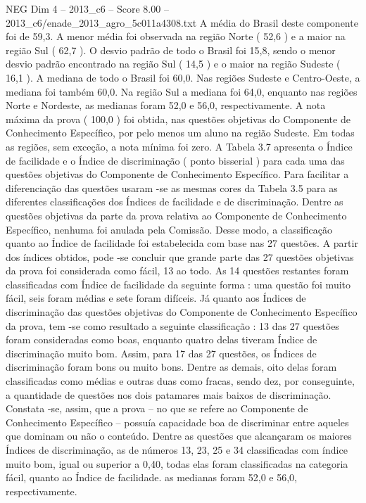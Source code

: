 \begin{textsample}{NEG Dim 4 – 2013\_c6 – Score 8.00 – 2013\_c6/enade\_2013\_agro\_5c011a4308.txt}
A média do Brasil deste componente foi de 59,3.
A menor média foi observada na região Norte ( 52,6 ) e a maior na região Sul ( 62,7 ).
O desvio padrão de todo o Brasil foi 15,8, sendo o menor desvio padrão encontrado na região Sul ( 14,5 ) e o maior na região Sudeste ( 16,1 ).
A mediana de todo o Brasil foi 60,0.
Nas regiões Sudeste e Centro-Oeste, a mediana foi também 60,0.
Na região Sul a mediana foi 64,0, enquanto nas regiões Norte e Nordeste, as medianas foram 52,0 e 56,0, respectivamente.
A nota máxima da prova ( 100,0 ) foi obtida, nas questões objetivas do Componente de Conhecimento Específico, por pelo menos um aluno na região Sudeste.
Em todas as regiões, sem exceção, a nota mínima foi zero.
A Tabela 3.7 apresenta o Índice de facilidade e o Índice de discriminação ( ponto bisserial ) para cada uma das questões objetivas do Componente de Conhecimento Específico.
Para facilitar a diferenciação das questões usaram -se as mesmas cores da Tabela 3.5 para as diferentes classificações dos Índices de facilidade e de discriminação.
Dentre as questões objetivas da parte da prova relativa ao Componente de Conhecimento Específico, nenhuma foi anulada pela Comissão.
Desse modo, a classificação quanto ao Índice de facilidade foi estabelecida com base nas 27 questões.
A partir dos índices obtidos, pode -se concluir que grande parte das 27 questões objetivas da prova foi considerada como fácil, 13 ao todo.
As 14 questões restantes foram classificadas com Índice de facilidade da seguinte forma : uma questão foi muito fácil, seis foram médias e sete foram difíceis.
Já quanto aos Índices de discriminação das questões objetivas do Componente de Conhecimento Específico da prova, tem -se como resultado a seguinte classificação : 13 das 27 questões foram consideradas como boas, enquanto quatro delas tiveram Índice de discriminação muito bom.
Assim, para 17 das 27 questões, os Índices de discriminação foram bons ou muito bons.
Dentre as demais, oito delas foram classificadas como médias e outras duas como fracas, sendo dez, por conseguinte, a quantidade de questões nos dois patamares mais baixos de discriminação.
Constata -se, assim, que a prova – no que se refere ao Componente de Conhecimento Específico – possuía capacidade boa de discriminar entre aqueles que dominam ou não o conteúdo.
Dentre as questões que alcançaram os maiores Índices de discriminação, as de números 13, 23, 25 e 34 classificadas com índice muito bom, igual ou superior a 0,40, todas elas foram classificadas na categoria fácil, quanto ao Índice de facilidade. as medianas foram 52,0 e 56,0, respectivamente.

\end{textsample}
